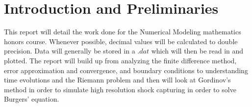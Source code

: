 \chapter{Introduction and Preliminaries}
This report will detail the work done for the Numerical Modeling mathematics honors course. Whenever possible, decimal values will be calculated to double precision. Data will generally be stored in a $.dat$ which will then be read in and plotted. The report will build up from analyzing the finite difference method, error approximation and convergence, and boundary conditions to understanding time evolutions and the Riemann problem and then will look at Gordinov's method in order to simulate high resolution shock capturing in order to solve Burgers' equation.